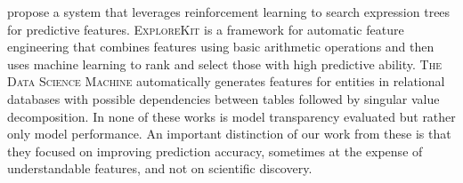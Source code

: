 \documentclass[ijds,nonblindrev]{informs-ijds}
\begin{document}




%





 \citet{KhuranaSamulowitzTuraga18} propose a system that leverages reinforcement learning to search expression trees for predictive features.  \textsc{ExploreKit} \citep{KatzShinSong16} is a framework for automatic feature engineering that combines features using basic arithmetic operations and then uses machine learning to rank and select those with high predictive ability.  \textsc{The Data Science Machine} \citep{KanterVeeramachaneni15} automatically generates features for entities in relational databases with possible dependencies between tables followed by singular value decomposition.  In none of these works is model transparency evaluated but rather only model performance.  An important distinction of our work from these is that they focused on improving prediction accuracy, sometimes at the expense of understandable features, and not on scientific discovery. 


\end{document}
